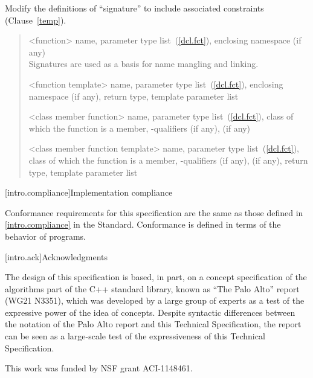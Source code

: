 Modify the definitions of ``signature'' to include associated
constraints (Clause~\ref{temp}).

\begin{quote}
%
<function> name, parameter type list~(\ref{dcl.fct}),  enclosing 
namespace (if any)\\
\enternote Signatures are used as a basis for
name mangling and linking.\exitnote

%
<function template> name, parameter type list~(\ref{dcl.fct}), enclosing namespace (if any),
return type,  template parameter list

%
<class member function> name, parameter type list~(\ref{dcl.fct}), class of which the
function is a member, \cv-qualifiers (if any),
  (if any)

%
<class member function template> name, parameter type list~(\ref{dcl.fct}), class of which the
function is a member, \cv-qualifiers (if any),
 (if any), return type,  template 
parameter list
\end{quote}

[intro.compliance]{Implementation compliance}

\pnum
Conformance requirements for this specification are the same as those 
defined in \ref{intro.compliance} in the \Cpp Standard.
\enternote 
Conformance is defined in terms of the behavior of programs.
\exitnote

[intro.ack]{Acknowledgments}

\pnum
The design of this specification is based, in part, on a concept 
specification of the algorithms part of the C++ standard library, known 
as ``The Palo Alto'' report (WG21 N3351), which was developed by a large 
group of experts as a test of the expressive power of the idea of 
concepts. Despite syntactic differences between the notation of the 
Palo Alto report and this Technical Specification, the report can be seen as a 
large-scale test of the expressiveness of this Technical Specification.

\pnum
This work was funded by NSF grant ACI-1148461.

